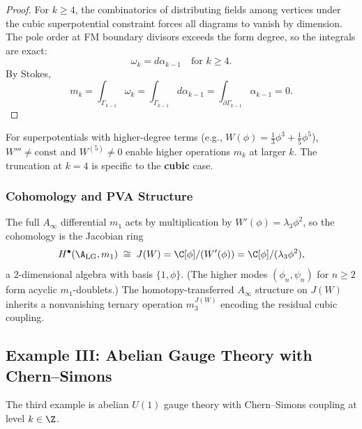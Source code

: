\begin{proof}
For $k \geq 4$, the combinatorics of distributing fields among vertices under the cubic superpotential constraint forces all diagrams to vanish by dimension. The pole order at FM boundary divisors exceeds the form degree, so the integrals are exact:
\begin{equation}
\omega_k = d\alpha_{k-1} \quad \text{for } k \geq 4.
\end{equation}
By Stokes,
\begin{equation}
m_k = \int_{\Gamma_{k-1}} \omega_k = \int_{\Gamma_{k-1}} d\alpha_{k-1} = \int_{\partial \Gamma_{k-1}} \alpha_{k-1} = 0.
\end{equation}
\end{proof}

\begin{remark}
For superpotentials with higher-degree terms (e.g., $W(\phi) = \frac{1}{3}\phi^3 + \frac{1}{5}\phi^5$), $W''' \neq \text{const}$ and $W^{(5)} \neq 0$ enable higher operations $m_k$ at larger $k$. The truncation at $k=4$ is specific to the \textbf{cubic} case.
\end{remark}

\subsubsection{Cohomology and PVA Structure}

\begin{proposition}
The full $A_\infty$ differential $m_1$ acts by multiplication by $W'(\phi) = \lambda_3 \phi^2$, so
the cohomology is the Jacobian ring
\begin{equation}
H^\bullet(\A_{\text{LG}}, m_1) \;\cong\; J(W) = \C[\phi]/(W'(\phi)) = \C[\phi]/(\lambda_3 \phi^2),
\end{equation}
a $2$-dimensional algebra with basis $\{1, \phi\}$.
(The higher modes $(\phi_n, \psi_n)$ for $n \geq 2$ form acyclic $m_1$-doublets.)
The homotopy-transferred $A_\infty$ structure on $J(W)$ inherits a nonvanishing ternary
operation $m_3^{J(W)}$ encoding the residual cubic coupling.
\end{proposition}

\subsection{Example III: Abelian Gauge Theory with Chern--Simons}
\label{prop:abelian_CS_complete}

The third example is abelian $U(1)$ gauge theory with Chern--Simons coupling at level $k \in \Z$.

